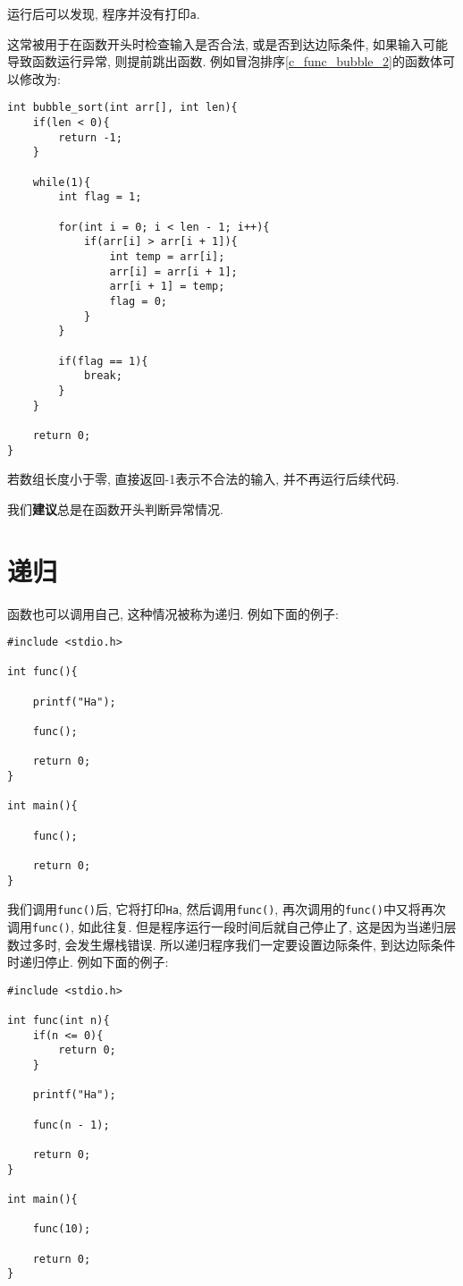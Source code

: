         运行后可以发现, 程序并没有打印\texttt{a}.

        这常被用于在函数开头时检查输入是否合法, 或是否到达边际条件, 如果输入可能导致函数运行异常, 则提前跳出函数. 例如冒泡排序\ref{c_func_bubble_2}的函数体可以修改为:
\begin{lstlisting}
int bubble_sort(int arr[], int len){
    if(len < 0){
        return -1;
    }

    while(1){
        int flag = 1;

        for(int i = 0; i < len - 1; i++){
            if(arr[i] > arr[i + 1]){
                int temp = arr[i];
                arr[i] = arr[i + 1];
                arr[i + 1] = temp;
                flag = 0;
            }
        }

        if(flag == 1){
            break;
        }
    }

    return 0;
}
\end{lstlisting}

        若数组长度小于零, 直接返回-1表示不合法的输入, 并不再运行后续代码.

        我们\textbf{建议}总是在函数开头判断异常情况.

    \section{递归} 
        函数也可以调用自己, 这种情况被称为递归. 例如下面的例子:
\begin{lstlisting}
#include <stdio.h>

int func(){

    printf("Ha");

    func();

    return 0;
}

int main(){

    func();

    return 0;
}
\end{lstlisting}

        我们调用\texttt{func()}后, 它将打印\texttt{Ha}, 然后调用\texttt{func()}, 再次调用的\texttt{func()}中又将再次调用\texttt{func()}, 如此往复. 但是程序运行一段时间后就自己停止了, 这是因为当递归层数过多时, 会发生爆栈错误. 所以递归程序我们一定要设置边际条件, 到达边际条件时递归停止. 例如下面的例子:
\begin{lstlisting}
#include <stdio.h>

int func(int n){
    if(n <= 0){
        return 0;
    }

    printf("Ha");

    func(n - 1);

    return 0;
}

int main(){

    func(10);

    return 0;
}
\end{lstlisting}


